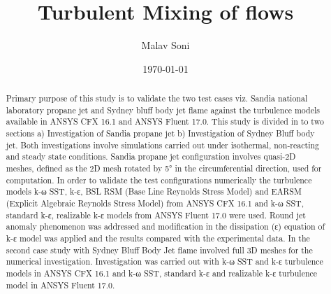 \documentclass[10pt,a4paper,notitlepage]{article}
\title{Turbulent Mixing of flows}
\author{Malav Soni}
\date{\today}
\begin{document}
\maketitle
\begin{abstract}%
\noindent
Primary purpose of this study is to validate the two test cases viz. Sandia national laboratory propane jet and Sydney bluff body jet flame against the turbulence models available in ANSYS CFX 16.1 and ANSYS Fluent 17.0. This study is divided in to two sections a) Investigation of Sandia propane jet b) Investigation of Sydney Bluff body jet. Both investigations involve simulations carried out under isothermal, non-reacting and steady state conditions. Sandia propane jet configuration involves quasi-2D meshes, defined as the 2D mesh rotated by 5° in the circumferential direction, used for computation. In order to validate the test configurations numerically the turbulence models k-ω SST, k-ε, BSL RSM (Base Line Reynolds Stress Model) and EARSM (Explicit Algebraic Reynolds Stress Model) from ANSYS CFX 16.1 and k-ω SST, standard k-ε, realizable k-ε models from ANSYS Fluent 17.0 were used. Round jet anomaly phenomenon was addressed and modification in the dissipation (ε) equation of k-ε model was applied and the results compared with the experimental data. In the second case study with Sydney Bluff Body Jet flame involved full 3D meshes for the numerical investigation. Investigation was carried out with k-ω SST and k-ε turbulence models in ANSYS CFX 16.1 and k-ω SST, standard k-ε and realizable k-ε turbulence model in ANSYS Fluent 17.0.
\end{abstract}
\end{document}
